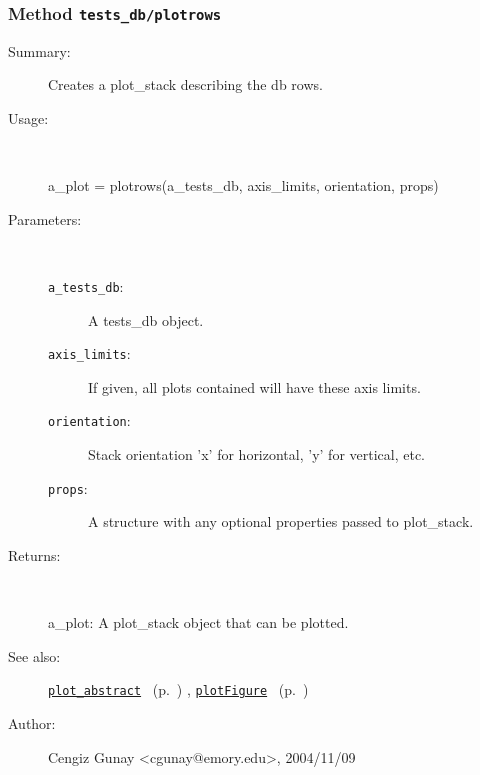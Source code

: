 \subsubsection[Method \texttt{plotrows}]{Method \texttt{tests\_db/plotrows}}%
%
\label{ref_tests_db__plotrows}%
\hypertarget{ref_tests_db__plotrows}{}%
\begin{description}
\item[Summary:]Creates a plot\_stack describing the db rows.
%
\item[Usage:]~%
\begin{lyxcode}%
a\_plot = plotrows(a\_tests\_db, axis\_limits, orientation, props)
%
\end{lyxcode}%
%
%
\item[Parameters:]~
\begin{description}%
\item[\texttt{a\_tests\_db}:]
 A tests\_db object.
\item[\texttt{axis\_limits}:]
 If given, all plots contained will have these axis limits.
\item[\texttt{orientation}:]
 Stack orientation 'x' for horizontal, 'y' for vertical, etc.
\item[\texttt{props}:]
 A structure with any optional properties passed to plot\_stack.
\end{description}%
%
\item[Returns:]~

	a\_plot: A plot\_stack object that can be plotted.
%
%
\item[See also:]%
\hyperlink{ref_plot_abstract}{\texttt{plot\_abstract}}%
\ (p.~\pageref{ref_plot_abstract})%
%
, \hyperlink{ref_plotFigure}{\texttt{plotFigure}}%
\ (p.~\pageref{ref_plotFigure})%
%
%
\item[Author:]%
Cengiz Gunay <cgunay@emory.edu>, 2004/11/09%
\end{description}
\methodline%
